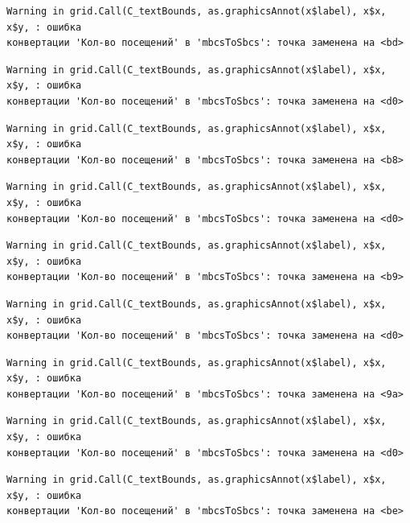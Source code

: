 \documentclass[
  letterpaper,
  DIV=11,
  numbers=noendperiod]{scrreprt}
\begin{document}
\begin{verbatim}
Warning in grid.Call(C_textBounds, as.graphicsAnnot(x$label), x$x, x$y, : ошибка
конвертации 'Кол-во посещений' в 'mbcsToSbcs': точка заменена на <bd>
\end{verbatim}

\begin{verbatim}
Warning in grid.Call(C_textBounds, as.graphicsAnnot(x$label), x$x, x$y, : ошибка
конвертации 'Кол-во посещений' в 'mbcsToSbcs': точка заменена на <d0>
\end{verbatim}

\begin{verbatim}
Warning in grid.Call(C_textBounds, as.graphicsAnnot(x$label), x$x, x$y, : ошибка
конвертации 'Кол-во посещений' в 'mbcsToSbcs': точка заменена на <b8>
\end{verbatim}

\begin{verbatim}
Warning in grid.Call(C_textBounds, as.graphicsAnnot(x$label), x$x, x$y, : ошибка
конвертации 'Кол-во посещений' в 'mbcsToSbcs': точка заменена на <d0>
\end{verbatim}

\begin{verbatim}
Warning in grid.Call(C_textBounds, as.graphicsAnnot(x$label), x$x, x$y, : ошибка
конвертации 'Кол-во посещений' в 'mbcsToSbcs': точка заменена на <b9>
\end{verbatim}

\begin{verbatim}
Warning in grid.Call(C_textBounds, as.graphicsAnnot(x$label), x$x, x$y, : ошибка
конвертации 'Кол-во посещений' в 'mbcsToSbcs': точка заменена на <d0>
\end{verbatim}

\begin{verbatim}
Warning in grid.Call(C_textBounds, as.graphicsAnnot(x$label), x$x, x$y, : ошибка
конвертации 'Кол-во посещений' в 'mbcsToSbcs': точка заменена на <9a>
\end{verbatim}

\begin{verbatim}
Warning in grid.Call(C_textBounds, as.graphicsAnnot(x$label), x$x, x$y, : ошибка
конвертации 'Кол-во посещений' в 'mbcsToSbcs': точка заменена на <d0>
\end{verbatim}

\begin{verbatim}
Warning in grid.Call(C_textBounds, as.graphicsAnnot(x$label), x$x, x$y, : ошибка
конвертации 'Кол-во посещений' в 'mbcsToSbcs': точка заменена на <be>
\end{verbatim}
\end{document}

